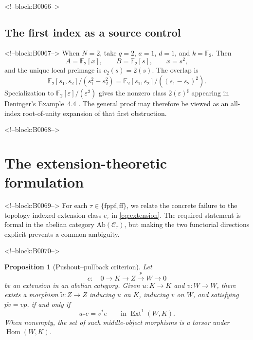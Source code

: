 \documentclass[11pt]{article}
\newtheorem{proposition}[theorem]{Proposition}
\theoremstyle{definition}
\newcommand{\Ext}{\operatorname{Ext}}
\newcommand{\Hom}{\operatorname{Hom}}
\newcommand{\sh}{\sharp}
\newcommand{\ff}{\mathrm{ff}}
\newcommand{\fppf}{\mathrm{fppf}}
\begin{document}
<!--block:B0066-->
\subsection{The first index as a source control}

<!--block:B0067-->
When \(N=2\), take \(q=2\), \(a=1\), \(d=1\), and \(k=\mathbb F_2\).
Then
\[
 A=\mathbb F_2[x],\qquad B=\mathbb F_2[s],\qquad x=s^2,
\]
and the unique local preimage is \(c_2(s)=2(s)\).  The overlap is
\[
 \mathbb F_2[s_1,s_2]/(s_1^2-s_2^2)
  =\mathbb F_2[s_1,s_2]/((s_1-s_2)^2).
\]
Specialization to
\(\mathbb F_2[\varepsilon]/(\varepsilon^2)\) gives the nonzero class
\(2(\varepsilon)^\sh\) appearing in
Deninger's Example~4.4 \cite[p.~22]{Deninger2025Rational}.  The general
proof may therefore be viewed as an all-index root-of-unity expansion of
that first obstruction.

<!--block:B0068-->
\section{The extension-theoretic formulation}\label{sec:ext}

<!--block:B0069-->
For each \(\tau\in\{\fppf,\ff\}\), we relate the concrete failure to the
topology-indexed extension class \(e_\tau\) in
\eqref{eq:extension}.  The required statement is formal in the abelian
category \(\mathrm{Ab}(\mathscr C_\tau)\), but making the two functorial
directions explicit prevents a common ambiguity.

<!--block:B0070-->
\begin{proposition}[Pushout--pullback criterion]\label{prop:extcriterion}
Let
\[
 e:\quad0\longrightarrow K\longrightarrow Z
   \xrightarrow{p}W\longrightarrow0
\]
be an extension in an abelian category.  Given
\(u\colon K\to K\) and \(v\colon W\to W\), there exists a morphism
\(\widetilde v\colon Z\to Z\) inducing \(u\) on \(K\), inducing \(v\) on
\(W\), and satisfying \(p\widetilde v=vp\), if and only if
\[
 u_*e=v^*e\qquad\text{in }\Ext^1(W,K).
 \tag{5.1}\label{eq:criterion}
\]
When nonempty, the set of such middle-object morphisms is a torsor under
\(\Hom(W,K)\).
\end{proposition}
\end{document}
